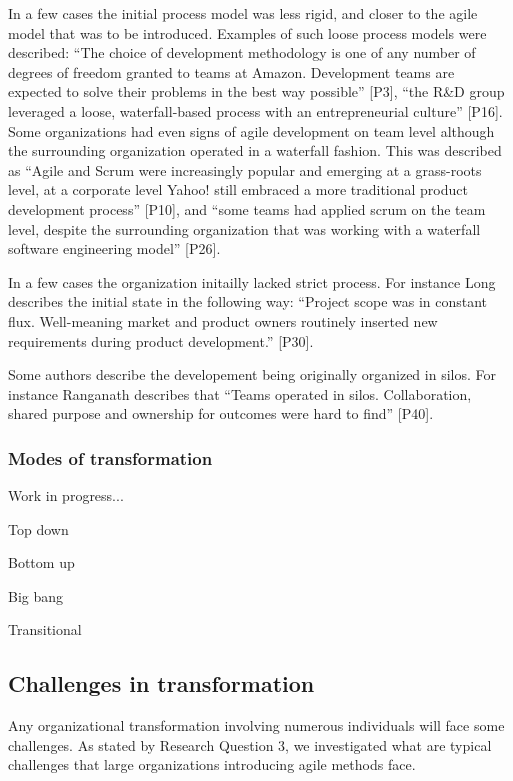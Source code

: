 \documentclass[preprint,authoryear,12pt]{elsarticle}
\begin{document}
In a few cases the initial process model was less rigid, and closer to the agile
model that was to be introduced. Examples of such loose process models were
described: ``The choice of development methodology is one of any number of
degrees of freedom granted to teams at Amazon. Development teams are expected to
solve their problems in the best way possible'' [P3], ``the R\&D group leveraged
a loose, waterfall-based process with an entrepreneurial culture'' [P16]. Some
organizations had even signs of agile development on team level although the
surrounding organization operated in a waterfall fashion. This was described as
``Agile and Scrum were increasingly popular and emerging at a grass-roots level,
at a corporate level Yahoo! still embraced a more traditional product
development process'' [P10], and ``some teams had applied scrum on the team
level, despite the surrounding organization that was working with a waterfall
software engineering model'' [P26].

In a few cases the organization initailly lacked strict process. For instance
Long describes the initial state in the following way: ``Project scope was in
constant flux. Well-meaning market and product owners routinely inserted new
requirements during product development.'' [P30].

Some authors describe the developement being originally organized in silos. For
instance Ranganath describes that ``Teams operated in silos. Collaboration,
shared purpose and ownership for outcomes were hard to find'' [P40].


\subsubsection{Modes of transformation}

Work in progress...

Top down

Bottom up

Big bang

Transitional


\subsection{Challenges in transformation}

Any organizational transformation involving numerous individuals will face some
challenges. As stated by Research Question 3, we investigated what are typical
challenges that large organizations introducing agile methods face.
\end{document}
